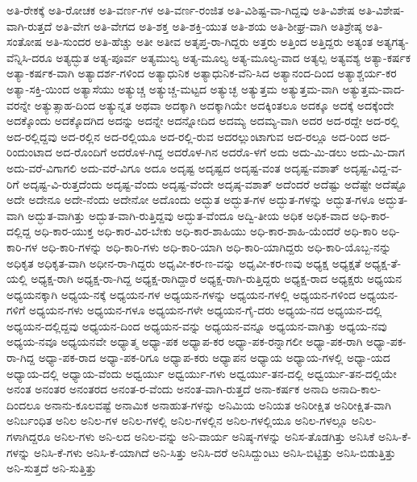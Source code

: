 {ಅತಿ-ರೇಕಕ್ಕೆ
ಅತಿ-ರೋಚಕ
ಅತಿ-ವರ್ಣ-ಗಳ
ಅತಿ-ವರ್ಣ-ರಂಜಿತ
ಅತಿ-ವಿಶಿಷ್ಟ-ವಾ-ಗಿದ್ದವು
ಅತಿ-ವಿಶೇಷ
ಅತಿ-ವಿಶೇಷ-ವಾಗಿ-ರುತ್ತದೆ
ಅತಿ-ವೇಗ
ಅತಿ-ವೇಗದ
ಅತಿ-ಶಕ್ತ
ಅತಿ-ಶಕ್ತಿ-ಯುತ
ಅತಿ-ಶಯ
ಅತಿ-ಶೀಘ್ರ-ವಾಗಿ
ಅತಿಶ್ರೇಷ್ಠ
ಅತಿ-ಸಂತೋಷ
ಅತಿ-ಸುಂದರ
ಅತಿ-ಹೆಚ್ಚು
ಅತೀ
ಅತೀವ
ಅತೃಪ್ತ-ರಾ-ಗಿದ್ದರು
ಅತ್ತರು
ಅತ್ತಿಂದ
ಅತ್ತಿದ್ದರು
ಅತ್ಯಂತ
ಅತ್ಯಗತ್ಯ-ವೆನ್ನಿಸಿ-ದರೂ
ಅತ್ಯದ್ಭುತ
ಅತ್ಯ-ಪೂರ್ವ
ಅತ್ಯಮುಲ್ಯ
ಅತ್ಯ-ಮೂಲ್ಯ
ಅತ್ಯ-ಮೂಲ್ಯ-ವಾದ
ಅತ್ಯಲ್ಪ
ಅತ್ಯವಶ್ಯ
ಅತ್ಯಾ-ಕರ್ಷಕ
ಅತ್ಯಾ-ಕರ್ಷಕ-ವಾಗಿ
ಅತ್ಯಾದರ್ಶ-ಗಳಿಂದ
ಅತ್ಯಾಧುನಿಕ
ಅತ್ಯಾಧುನಿಕ-ವೆನಿ-ಸಿದ
ಅತ್ಯಾನಂದ-ದಿಂದ
ಅತ್ಯಾಶ್ಚರ್ಯ-ಕರ
ಅತ್ಯಾ-ಸಕ್ತಿ-ಯಿಂದ
ಅತ್ಯಾಸೆಯು
ಅತ್ಯುಚ್ಚ
ಅತ್ಯುಚ್ಚ-ಮಟ್ಟದ
ಅತ್ಯುಚ್ಛ
ಅತ್ಯುತ್ತಮ
ಅತ್ಯುತ್ತಮ-ವಾಗಿ
ಅತ್ಯುತ್ತಮ-ವಾದ-ವರನ್ನೇ
ಅತ್ಯುತ್ಸಾಹ-ದಿಂದ
ಅತ್ಯುನ್ನತ
ಅಥವಾ
ಅದಕ್ಕಾಗಿ
ಅದಕ್ಕಾಗಿಯೇ
ಅದಕ್ಕಿಂತಲೂ
ಅದಕ್ಕೂ
ಅದಕ್ಕೆ
ಅದಕ್ಕೆಂದೇ
ಅದಕ್ಕೊಂದು
ಅದಕ್ಕೊದಗಿದ
ಅದನ್ನು
ಅದನ್ನೇ
ಅದನ್ನೋದಿದ
ಅದಮ್ಯ
ಅದಮ್ಯ-ವಾಗಿ
ಅದರ
ಅದ-ರದ್ದೇ
ಅದ-ರಲ್ಲಿ
ಅದ-ರಲ್ಲಿದ್ದವು
ಅದ-ರಲ್ಲಿನ
ಅದ-ರಲ್ಲಿಯೂ
ಅದ-ರಲ್ಲಿ-ರುವ
ಅದರಲ್ಲುಂಟಾಗುವ
ಅದ-ರಲ್ಲೂ
ಅದ-ರಿಂದ
ಅದ-ರಿಂದುಂಟಾದ
ಅದ-ರೊಂದಿಗೆ
ಅದರೊಳ-ಗಿದ್ದ
ಅದರೊಳ-ಗಿನ
ಅದರೊ-ಳಗೆ
ಅದು
ಅದು-ಮಿ-ಡಲು
ಅದು-ಮಿ-ದಾಗ
ಅದು-ವರೆ-ವಿಗಾಗಲಿ
ಅದು-ವರೆ-ವಿಗೂ
ಅದೂ
ಅದೃಷ್ಟ
ಅದೃಷ್ಟದ
ಅದೃಷ್ಟ-ವಂತ
ಅದೃಷ್ಟ-ವಶಾತ್
ಅದೃಷ್ಟ-ವಿದ್ದ-ವ-ರಿಗೆ
ಅದೃಷ್ಟ-ವಿ-ರುತ್ತದೆಂದು
ಅದೃಷ್ಟ-ವೆಂದು
ಅದೃಷ್ಟ-ವೆಂದೇ
ಅದೃಷ್ಠ-ವಶಾತ್
ಅದೆಂದರೆ
ಅದೆಷ್ಟು
ಅದೆಷ್ಟೇ
ಅದೆಷ್ಟೊ
ಅದೇ
ಅದೇನೂ
ಅದೇ-ನೆಂದು
ಅದೇನೋ
ಅದೊಂದು
ಅದ್ಭುತ
ಅದ್ಭುತ-ಗಳ
ಅದ್ಭುತ-ಗಳನ್ನು
ಅದ್ಭುತ-ಗಳೂ
ಅದ್ಭುತ-ವಾಗಿ
ಅದ್ಭುತ-ವಾಗಿತ್ತು
ಅದ್ಭುತ-ವಾಗಿ-ರುತ್ತಿದ್ದವು
ಅದ್ಭುತ-ವೆಂದೂ
ಅದ್ವಿ-ತೀಯ
ಅಧಿಕ
ಅಧಿಕ-ವಾದ
ಅಧಿ-ಕಾರ-ದಲ್ಲಿದ್ದ
ಅಧಿ-ಕಾರ-ಯುಕ್ತ
ಅಧಿ-ಕಾರ-ವಿರ-ಬೇಕು
ಅಧಿ-ಕಾರ-ಶಾಹಿಯು
ಅಧಿ-ಕಾರ-ಶಾಹಿ-ಯೆಂದರೆ
ಅಧಿ-ಕಾರಿ
ಅಧಿ-ಕಾರಿ-ಗಳ
ಅಧಿ-ಕಾರಿ-ಗಳನ್ನು
ಅಧಿ-ಕಾರಿ-ಗಳು
ಅಧಿ-ಕಾರಿ-ಯಾಗಿ
ಅಧಿ-ಕಾರಿ-ಯಾಗಿದ್ದರು
ಅಧಿ-ಕಾರಿ-ಯೊಬ್ಬ-ನನ್ನು
ಅಧಿಕೃತ
ಅಧಿಕೃತ-ವಾಗಿ
ಅಧೀನ-ರಾ-ಗಿದ್ದರು
ಅಧೃವೀ-ಕರ-ಣ-ವನ್ನು
ಅಧೃವೀ-ಕರ-ಣವು
ಅಧ್ಯಕ್ಷ
ಅಧ್ಯಕ್ಷತೆ
ಅಧ್ಯಕ್ಷ-ತೆ-ಯಲ್ಲಿ
ಅಧ್ಯಕ್ಷ-ರಾಗಿ
ಅಧ್ಯಕ್ಷ-ರಾ-ಗಿದ್ದ
ಅಧ್ಯಕ್ಷ-ರಾಗಿದ್ದಾರೆ
ಅಧ್ಯಕ್ಷ-ರಾಗಿ-ರುತ್ತಿದ್ದರು
ಅಧ್ಯಕ್ಷ-ರಾದ
ಅಧ್ಯಕ್ಷರು
ಅಧ್ಯಯನ
ಅಧ್ಯಯನಕ್ಕಾಗಿ
ಅಧ್ಯಯ-ನಕ್ಕೆ
ಅಧ್ಯಯನ-ಗಳ
ಅಧ್ಯಯನ-ಗಳನ್ನು
ಅಧ್ಯಯನ-ಗಳಲ್ಲಿ
ಅಧ್ಯಯನ-ಗಳಿಂದ
ಅಧ್ಯಯನ-ಗಳಿಗೆ
ಅಧ್ಯಯನ-ಗಳು
ಅಧ್ಯಯನ-ಗಳೂ
ಅಧ್ಯಯನ-ಗಳೇ
ಅಧ್ಯಯನ-ಗೈ-ದರು
ಅಧ್ಯಯ-ನದ
ಅಧ್ಯಯನ-ದಲ್ಲಿ
ಅಧ್ಯಯನ-ದಲ್ಲಿದ್ದವು
ಅಧ್ಯಯನ-ದಿಂದ
ಅಧ್ಯಯನ-ವನ್ನು
ಅಧ್ಯಯನ-ವನ್ನೂ
ಅಧ್ಯಯನ-ವಾಗಿತ್ತು
ಅಧ್ಯಯ-ನವು
ಅಧ್ಯಯ-ನವೂ
ಅಧ್ಯಯನವೇ
ಅಧ್ಯಾತ್ಮ
ಅಧ್ಯಾ-ಪಕ
ಅಧ್ಯಾಪ-ಕರ
ಅಧ್ಯಾ-ಪಕ-ರನ್ನಾಗಲೀ
ಅಧ್ಯಾ-ಪಕ-ರಾಗಿ
ಅಧ್ಯಾ-ಪಕ-ರಾ-ಗಿದ್ದ
ಅಧ್ಯಾ-ಪಕ-ರಾದ
ಅಧ್ಯಾ-ಪಕ-ರಿಗೂ
ಅಧ್ಯಾಪ-ಕರು
ಅಧ್ಯಾಪನ
ಅಧ್ಯಾಯ
ಅಧ್ಯಾಯ-ಗಳಲ್ಲಿ
ಅಧ್ಯಾ-ಯದ
ಅಧ್ಯಾಯ-ದಲ್ಲಿ
ಅಧ್ಯಾಯ-ವೆಂದು
ಅಧ್ವರ್ಯು
ಅಧ್ವರ್ಯು-ಗಳು
ಅಧ್ವರ್ಯು-ತನ-ದಲ್ಲಿ
ಅಧ್ವರ್ಯು-ತನ-ದಲ್ಲಿಯೇ
ಅನಂತ
ಅನಂತರ
ಅನಂತರದ
ಅನಂತ-ರ-ವೆಂದು
ಅನಂತ-ವಾಗಿ-ರುತ್ತದೆ
ಅನಾ-ಕರ್ಷಕ
ಅನಾದಿ
ಅನಾದಿ-ಕಾಲ-ದಿಂದಲೂ
ಅನಾನು-ಕೂಲವಷ್ಟೆ
ಅನಾಮಿಕ
ಅನಾಹುತ-ಗಳನ್ನು
ಅನಿಮಿಯ
ಅನಿಯತ
ಅನಿರೀಕ್ಷಿತ
ಅನಿರೀಕ್ಷಿತ-ವಾಗಿ
ಅನಿರ್ಬಂಧಿತ
ಅನಿಲ
ಅನಿಲ-ಗಳ
ಅನಿಲ-ಗಳಲ್ಲಿ
ಅನಿಲ-ಗಳಲ್ಲಿನ
ಅನಿಲ-ಗಳಲ್ಲಿಯೂ
ಅನಿಲ-ಗಳಲ್ಲೂ
ಅನಿಲ-ಗಳಾಗಿದ್ದರೂ
ಅನಿಲ-ಗಳು
ಅನಿ-ಲದ
ಅನಿಲ-ವನ್ನು
ಅನಿ-ವಾರ್ಯ
ಅನಿಷ್ಠ-ಗಳನ್ನು
ಅನಿಸ-ತೊಡಗಿತ್ತು
ಅನಿಸಿಕೆ
ಅನಿಸಿ-ಕೆ-ಗಳನ್ನು
ಅನಿಸಿ-ಕೆ-ಗಳು
ಅನಿಸಿ-ಕೆ-ಯಾಗಿದೆ
ಅನಿ-ಸಿತ್ತು
ಅನಿಸಿ-ದರೆ
ಅನಿಸಿದ್ದುಂಟು
ಅನಿಸಿ-ಬಿಟ್ಟಿತ್ತು
ಅನಿಸಿ-ಬಿಡುತ್ತಿತ್ತು
ಅನಿ-ಸುತ್ತದೆ
ಅನಿ-ಸುತ್ತಿತ್ತು
}
